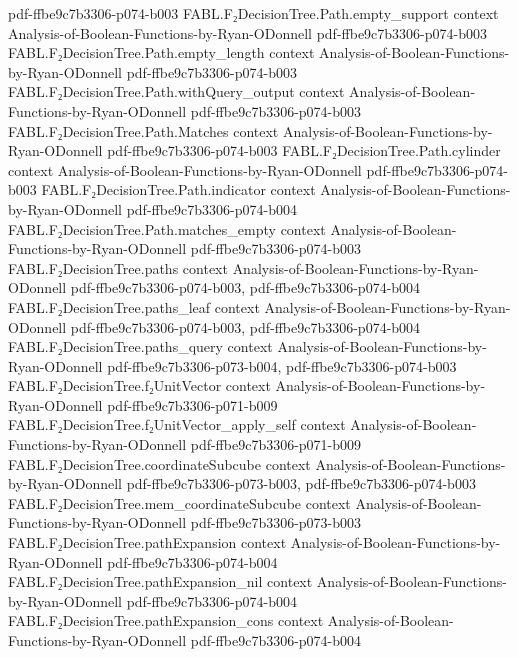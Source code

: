 \begin{theorem}
  {pdf-ffbe9c7b3306-p074-b003}
\proofstep
  {FABL.F₂DecisionTree.Path.empty_support}
  {context}
  {Analysis-of-Boolean-Functions-by-Ryan-ODonnell}
  {pdf-ffbe9c7b3306-p074-b003}
\proofstep
  {FABL.F₂DecisionTree.Path.empty_length}
  {context}
  {Analysis-of-Boolean-Functions-by-Ryan-ODonnell}
  {pdf-ffbe9c7b3306-p074-b003}
\proofstep
  {FABL.F₂DecisionTree.Path.withQuery_output}
  {context}
  {Analysis-of-Boolean-Functions-by-Ryan-ODonnell}
  {pdf-ffbe9c7b3306-p074-b003}
\proofstep
  {FABL.F₂DecisionTree.Path.Matches}
  {context}
  {Analysis-of-Boolean-Functions-by-Ryan-ODonnell}
  {pdf-ffbe9c7b3306-p074-b003}
\proofstep
  {FABL.F₂DecisionTree.Path.cylinder}
  {context}
  {Analysis-of-Boolean-Functions-by-Ryan-ODonnell}
  {pdf-ffbe9c7b3306-p074-b003}
\proofstep
  {FABL.F₂DecisionTree.Path.indicator}
  {context}
  {Analysis-of-Boolean-Functions-by-Ryan-ODonnell}
  {pdf-ffbe9c7b3306-p074-b004}
\proofstep
  {FABL.F₂DecisionTree.Path.matches_empty}
  {context}
  {Analysis-of-Boolean-Functions-by-Ryan-ODonnell}
  {pdf-ffbe9c7b3306-p074-b003}
\proofstep
  {FABL.F₂DecisionTree.paths}
  {context}
  {Analysis-of-Boolean-Functions-by-Ryan-ODonnell}
  {pdf-ffbe9c7b3306-p074-b003,
    pdf-ffbe9c7b3306-p074-b004}
\proofstep
  {FABL.F₂DecisionTree.paths_leaf}
  {context}
  {Analysis-of-Boolean-Functions-by-Ryan-ODonnell}
  {pdf-ffbe9c7b3306-p074-b003,
    pdf-ffbe9c7b3306-p074-b004}
\proofstep
  {FABL.F₂DecisionTree.paths_query}
  {context}
  {Analysis-of-Boolean-Functions-by-Ryan-ODonnell}
  {pdf-ffbe9c7b3306-p073-b004,
    pdf-ffbe9c7b3306-p074-b003}
\proofstep
  {FABL.F₂DecisionTree.f₂UnitVector}
  {context}
  {Analysis-of-Boolean-Functions-by-Ryan-ODonnell}
  {pdf-ffbe9c7b3306-p071-b009}
\proofstep
  {FABL.F₂DecisionTree.f₂UnitVector_apply_self}
  {context}
  {Analysis-of-Boolean-Functions-by-Ryan-ODonnell}
  {pdf-ffbe9c7b3306-p071-b009}
\proofstep
  {FABL.F₂DecisionTree.coordinateSubcube}
  {context}
  {Analysis-of-Boolean-Functions-by-Ryan-ODonnell}
  {pdf-ffbe9c7b3306-p073-b003,
    pdf-ffbe9c7b3306-p074-b003}
\proofstep
  {FABL.F₂DecisionTree.mem_coordinateSubcube}
  {context}
  {Analysis-of-Boolean-Functions-by-Ryan-ODonnell}
  {pdf-ffbe9c7b3306-p073-b003}
\proofstep
  {FABL.F₂DecisionTree.pathExpansion}
  {context}
  {Analysis-of-Boolean-Functions-by-Ryan-ODonnell}
  {pdf-ffbe9c7b3306-p074-b004}
\proofstep
  {FABL.F₂DecisionTree.pathExpansion_nil}
  {context}
  {Analysis-of-Boolean-Functions-by-Ryan-ODonnell}
  {pdf-ffbe9c7b3306-p074-b004}
\proofstep
  {FABL.F₂DecisionTree.pathExpansion_cons}
  {context}
  {Analysis-of-Boolean-Functions-by-Ryan-ODonnell}
  {pdf-ffbe9c7b3306-p074-b004}

\end{theorem}
